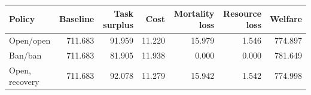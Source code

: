 \begin{tabular}{lrrrrrr}
\toprule
Policy & Baseline & Task surplus & Cost & Mortality loss & Resource loss & Welfare \\
\midrule
Open/open & 711.683 & 91.959 & 11.220 & 15.979 & 1.546 & 774.897 \\
Ban/ban & 711.683 & 81.905 & 11.938 & 0.000 & 0.000 & 781.649 \\
Open, recovery & 711.683 & 92.078 & 11.279 & 15.942 & 1.542 & 774.998 \\
\bottomrule
\end{tabular}
